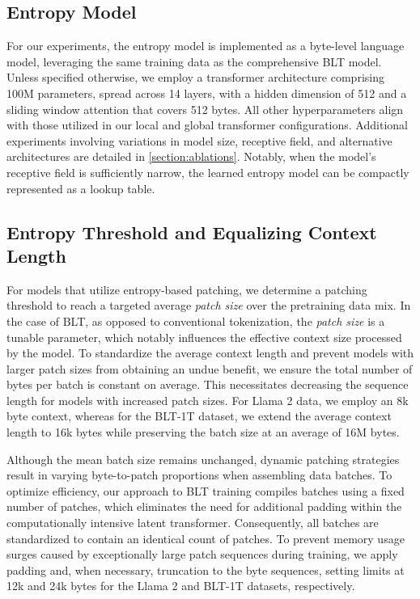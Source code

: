 \subsection{Entropy Model} For our experiments, the entropy model is implemented as a byte-level language model, leveraging the same training data as the comprehensive {\textsc BLT} model. Unless specified otherwise, we employ a transformer architecture comprising 100M parameters, spread across 14 layers, with a hidden dimension of 512 and a sliding window attention that covers 512 bytes. All other hyperparameters align with those utilized in our local and global transformer configurations. Additional experiments involving variations in model size, receptive field, and alternative architectures are detailed in \autoref{section:ablations}. Notably, when the model’s receptive field is sufficiently narrow, the learned entropy model can be compactly represented as a lookup table.

\subsection{Entropy Threshold and Equalizing Context Length} For models that utilize entropy-based patching, we determine a patching threshold to reach a targeted average \textit{patch size} over the pretraining data mix. In the case of {\textsc BLT}, as opposed to conventional tokenization, the \textit{patch size} is a tunable parameter, which notably influences the effective context size processed by the model. To standardize the average context length and prevent models with larger patch sizes from obtaining an undue benefit, we ensure the total number of bytes per batch is constant on average. This necessitates decreasing the sequence length for models with increased patch sizes. For Llama 2 data, we employ an 8k byte context, whereas for the {\textsc BLT}-1T dataset, we extend the average context length to 16k bytes while preserving the batch size at an average of 16M bytes.

Although the mean batch size remains unchanged, dynamic patching strategies result in varying byte-to-patch proportions when assembling data batches. To optimize efficiency, our approach to {\textsc BLT} training compiles batches using a fixed number of patches, which eliminates the need for additional padding within the computationally intensive latent transformer. Consequently, all batches are standardized to contain an identical count of patches. To prevent memory usage surges caused by exceptionally large patch sequences during training, we apply padding and, when necessary, truncation to the byte sequences, setting limits at 12k and 24k bytes for the Llama 2 and {\textsc BLT}-1T datasets, respectively.

